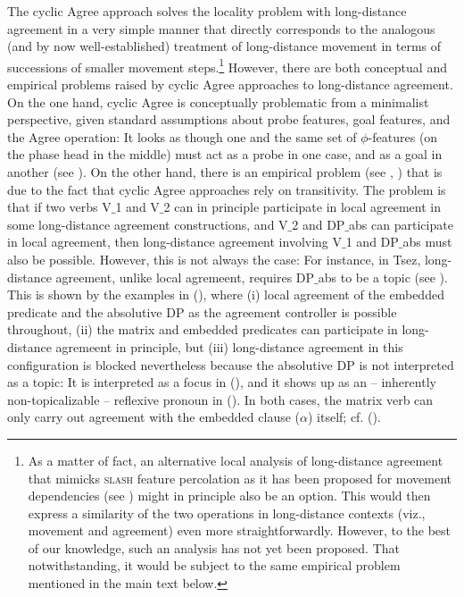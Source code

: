 \documentclass[output=paper
,modfonts
,nonflat]{langsci/langscibook}
\begin{document}
The cyclic Agree approach solves the locality problem with
long-distance agreement in a very simple manner that directly
corresponds to the analogous (and by now well-established) treatment
of long-distance movement in terms of successions of smaller movement
steps.\footnote{As a matter of fact, an alternative local analysis of
  long-distance agreement that mimicks {\scshape slash} feature percolation
  as it has been proposed for movement dependencies (see
  \cite{Gazdar:81}) might in principle also be an option. This would
  then express a similarity of the two operations in long-distance
  contexts (viz., movement and agreement) even more
  straightforwardly. However, to the best of our knowledge, such an
  analysis has not yet been proposed. That notwithstanding, it would
  be subject to the same empirical problem mentioned in the main text
  below.}  However, there are both conceptual and empirical problems
raised by cyclic Agree approaches to long-distance agreement. On the
one hand, cyclic Agree is conceptually problematic from a minimalist
perspective, given standard assumptions about probe features, goal
features, and the Agree operation: It looks as though one and the same
set of $\phi$-features (on the phase head in the middle) must act as a
probe in one case, and as a goal in another (see \cite{Bhatt:05}). On
the other hand, there is an empirical problem (see
\cite{Polinsky&Potsdam:01}, \cite{Bhatt&Keine:16:lon}) that is due to the
fact that cyclic Agree approaches rely on transitivity. The problem is
that if two verbs V$\_$1 and V$\_$2 can in principle participate in local
agreement in some long-distance agreement constructions, and V$\_$2 and
DP$\_${abs} can participate in local agreement, then long-distance
agreement involving V$\_$1 and DP$\_${abs} must also be possible. However,
this is not always the  case: For instance,  in Tsez, long-distance
agreement, unlike local agremeent, requires DP$\_${abs} to
be a topic (see \cite{Polinsky&Potsdam:01}). This is shown by the
examples in (\Next), where (i) local agreement of the embedded predicate and
the absolutive DP as the agreement controller is possible throughout,
(ii) the matrix and embedded predicates can participate in
long-distance agremeent in principle, but (iii) long-distance
agreement in this configuration is blocked nevertheless because the
absolutive DP is not interpreted as a topic: It is interpreted as a
focus in (\Next[a]), and it shows up as an -- inherently
non-topicalizable -- reflexive pronoun in (\Next[c]). In both cases, the
matrix verb can only carry out agreement with the embedded clause
($\alpha$) itself; cf. (\Next[b--d]). 
\end{document}
